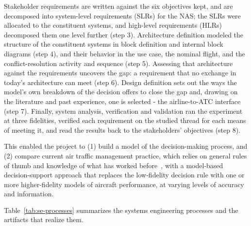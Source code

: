 Stakeholder requirements are written against the six objectives kept, and are decomposed into system-level requirements (SLRs) for the NAS; the SLRs were allocated to the constituent systems, and high-level requirements (HLRs) decomposed them one level further (step 3). Architecture definition modeled the structure of the constituent systems in block definition and internal block diagrams (step 4), and their behavior in the use case, the nominal flight, and the conflict-resolution activity and sequence (step 5). Assessing that architecture against the requirements uncovers the gap: a requirement that no exchange in today's architecture can meet (step 6). Design definition sets out the ways the model's own breakdown of the decision offers to close the gap and, drawing on the literature and past experience, one is selected - the airline-to-ATC interface (step 7). Finally, system analysis, verification and validation ran the experiment at three fidelities, verified each requirement on the studied thread for each means of meeting it, and read the results back to the stakeholders' objectives (step 8).

This enabled the project to (1) build a model of the decision-making process, and (2) compare current air traffic management practice, which relies on general rules of thumb and knowledge of what has worked before~\cite{rantanen2012conflictManeuvers,kirwan2001coraStrategies}, with a model-based decision-support approach that replaces the low-fidelity decision rule with one or more higher-fidelity models of aircraft performance, at varying levels of accuracy and information.

Table~\ref{tab:se-processes} summarizes the systems engineering processes and the artifacts that realize them.

